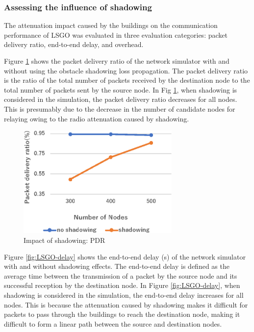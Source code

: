 \documentclass[conference]{IEEEtran}
\begin{document}
\subsubsection{Assessing the influence of shadowing}
The attenuation impact caused by the buildings on the communication performance of LSGO was evaluated in three evaluation categories: packet delivery ratio, end-to-end delay, and overhead.  

Figure \ref{fig:LSGO-PDR} shows the packet delivery ratio of the network simulator with and without using the obstacle shadowing loss propagation. 
The packet delivery ratio is the ratio of the total number of packets received by the destination node to the total number of packets sent by the source node.
In Fig \ref{fig:LSGO-PDR}, when shadowing is considered in the simulation, the packet delivery ratio decreases for all nodes. This is presumably due to the decrease in the number of candidate nodes for relaying owing to the radio attenuation caused by shadowing.

\begin{figure}[!ht]
\centering
\includegraphics[width=80mm]{figures/LSGO_PDR.eps}
\caption{Impact of shadowing: PDR }
\label{fig:LSGO-PDR}
\end{figure}


Figure \ref{fig:LSGO-delay} shows the end-to-end delay (s) of the network simulator with and without shadowing effects. The end-to-end delay is defined as the average time between the transmission of a packet by the source node and its successful reception by the destination node.
In Figure \ref{fig:LSGO-delay}, when shadowing is considered in the simulation, the end-to-end delay increases for all nodes. This is because the attenuation caused by shadowing makes it difficult for packets to pass through the buildings to reach the destination node, making it difficult to form a linear path between the source and destination nodes.
\end{document}
